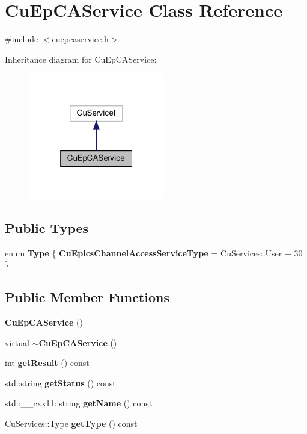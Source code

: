 \section{Cu\+Ep\+C\+A\+Service Class Reference}
\label{classCuEpCAService}


{\ttfamily \#include $<$cuepcaservice.\+h$>$}



Inheritance diagram for Cu\+Ep\+C\+A\+Service\+:\nopagebreak
\begin{figure}[H]
\begin{center}
\leavevmode
\includegraphics[width=169pt]{classCuEpCAService__inherit__graph}
\end{center}
\end{figure}
\subsection*{Public Types}
\begin{DoxyCompactItemize}
\item 
enum \textbf{ Type} \{ \textbf{ Cu\+Epics\+Channel\+Access\+Service\+Type} = Cu\+Services\+:\+:User + 30
 \}
\end{DoxyCompactItemize}
\subsection*{Public Member Functions}
\begin{DoxyCompactItemize}
\item 
\textbf{ Cu\+Ep\+C\+A\+Service} ()
\item 
virtual \textbf{ $\sim$\+Cu\+Ep\+C\+A\+Service} ()
\item 
int \textbf{ get\+Result} () const
\item 
std\+::string \textbf{ get\+Status} () const
\item 
std\+::\+\_\+\+\_\+cxx11\+::string \textbf{ get\+Name} () const
\item 
Cu\+Services\+::\+Type \textbf{ get\+Type} () const
\end{DoxyCompactItemize}


